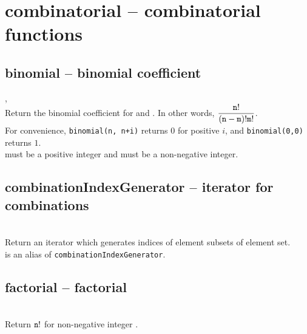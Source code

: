 

 \section{combinatorial -- combinatorial functions}
%
  \subsection{binomial -- binomial coefficient}
   {%
     ,\ %
   }{%
   }\\
   \spacing
   \quad Return the binomial coefficient for  and .
   In other words, $\displaystyle{\frac{{\texttt n} !}{({\texttt n} - {\texttt m}) ! {\texttt m} !}}$.\\
   \spacing
   \negok For convenience, {\tt binomial(n, n+i)} returns \(0\) for positive \(i\), and {\tt binomial(0,0)} returns \(1\).\\
   \spacing
   \quad {} must be a positive integer and  must be
   a non-negative integer. \\

  \subsection{combinationIndexGenerator -- iterator for combinations}

   \\
   \spacing
   \quad Return an iterator which generates indices of 
   element subsets of  element set.\\
   \spacing 
   is an alias of {\tt combinationIndexGenerator}.\\

  \subsection{factorial -- factorial}
   \\
   \spacing
   \quad Return \({\texttt n}!\) for non-negative integer .\\

